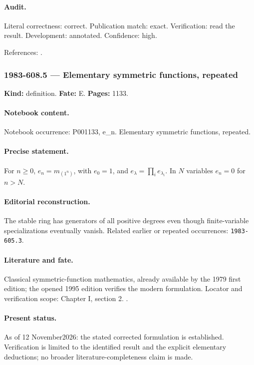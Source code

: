\paragraph{Audit.} Literal correctness: correct. Publication match: exact. Verification: read the result. Development: annotated. Confidence: high.

\noindent References: \citep{macdonald1995symmetric}.\par

\subsubsection{1983-608.5 --- Elementary symmetric functions, repeated}

\label{item:1983-608.5}

\noindent\textbf{Kind:} definition. \textbf{Fate:} E. \textbf{Pages:} 1133.\par

\paragraph{Notebook content.} Notebook occurrence: P001133, e_n. Elementary symmetric functions, repeated.

\paragraph{Precise statement.} For \(n\ge0\), \(e_n=m_{(1^n)}\), with \(e_0=1\), and \(e_\lambda=\prod_i e_{\lambda_i}\). In \(N\) variables \(e_n=0\) for \(n>N\).

\paragraph{Editorial reconstruction.} The stable ring has generators of all positive degrees even though finite-variable specializations eventually vanish. Related earlier or repeated occurrences: \texttt{1983-605.3}.

\paragraph{Literature and fate.} Classical symmetric-function mathematics, already available by the 1979 first edition; the opened 1995 edition verifies the modern formulation. Locator and verification scope: Chapter I, section 2. \cite{macdonald1995symmetric}.

\paragraph{Present status.} As of 12 November2026: the stated corrected formulation is established. Verification is limited to the identified result and the explicit elementary deductions; no broader literature-completeness claim is made.


